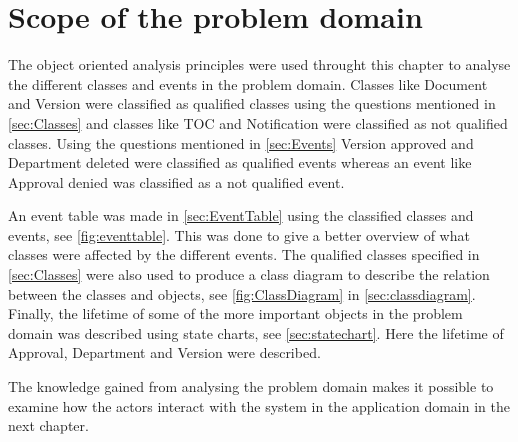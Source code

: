 \section{Scope of the problem domain}

The object oriented analysis principles were used throught this chapter to analyse the different classes and events in the problem domain.
Classes like Document and Version were classified as qualified classes using the questions mentioned in \cref{sec:Classes} and classes like TOC and Notification were classified as not qualified classes.
Using the questions mentioned in \cref{sec:Events} Version approved and Department deleted were classified as qualified events whereas an event like Approval denied was classified as a not qualified event.

An event table was made in \cref{sec:EventTable} using the classified classes and events, see \cref{fig:eventtable}.
This was done to give a better overview of what classes were affected by the different events.
The qualified classes specified in \cref{sec:Classes} were also used to produce a class diagram to describe the relation between the classes and objects, see \cref{fig:ClassDiagram} in \cref{sec:classdiagram}.
Finally, the lifetime of some of the more important objects in the problem domain was described using state charts, see \cref{sec:statechart}.
Here the lifetime of Approval, Department and Version were described.

The knowledge gained from analysing the problem domain makes it possible to examine how the actors interact with the system in the application domain in the next chapter.

